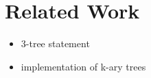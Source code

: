 \section{Related Work}\label{section:related_work}
\begin{itemize}
	\item 3-tree statement
	\item implementation of k-ary trees
\end{itemize}